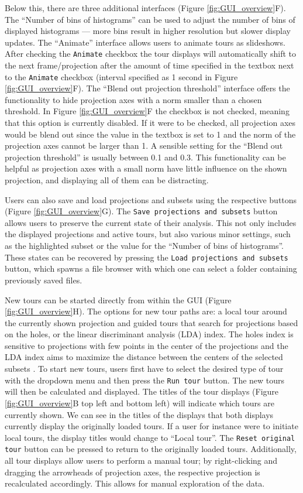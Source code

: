 \documentclass[article]{ajs}
\begin{document}
Below this, there are three additional interfaces (Figure \ref{fig:GUI_overview}F). The ``Number of bins of histograms'' can be used to adjust the number of bins of displayed histograms — more bins result in higher resolution but slower display updates. The ``Animate'' interface allows users to animate tours as slideshows. After checking the \texttt{Animate} checkbox the tour displays will automatically shift to the next frame/projection after the amount of time specified in the textbox next to the \texttt{Animate} checkbox (interval specified as 1 second in Figure \ref{fig:GUI_overview}F). The ``Blend out projection threshold'' interface offers the functionality to hide projection axes with a norm smaller than a chosen threshold. In Figure \ref{fig:GUI_overview}F the checkbox is not checked, meaning that this option is currently disabled. If it were to be checked, all projection axes would be blend out since the value in the textbox is set to 1 and the norm of the projection axes cannot be larger than 1. A sensible setting for the ``Blend out projection threshold'' is usually between 0.1 and 0.3. This functionality can be helpful as projection axes with a small norm have little influence on the shown projection, and displaying all of them can be distracting.

Users can also save and load projections and subsets using the respective buttons (Figure \ref{fig:GUI_overview}G). The \texttt{Save projections and subsets} button allows users to preserve the current state of their analysis. This not only includes the displayed projections and active tours, but also various minor settings, such as the highlighted subset or the value for the ``Number of bins of histograms''. These states can be recovered by pressing the \texttt{Load projections and subsets} button, which spawns a file browser with which one can select a folder containing previously saved files.

New tours can be started directly from within the GUI (Figure \ref{fig:GUI_overview}H). The options for new tour paths are: a local tour around the currently shown projection and guided tours that search for projections based on the holes, or the linear discriminant analysis (LDA) index. The holes index is sensitive to projections with few points in the center of the projections and the LDA index aims to maximize the distance between the centers of the selected subsets \citep{lckl2005, ggobi}. To start new tours, users first have to select the desired type of tour with the dropdown menu and then press the \texttt{Run tour} button. The new tours will then be calculated and displayed. The titles of the tour displays (Figure \ref{fig:GUI_overview}B top left and bottom left) will indicate which tours are currently shown. We can see in the titles of the displays that both displays currently display the originally loaded tours. If a user for instance were to initiate local tours, the display titles would change to ``Local tour''. The \texttt{Reset original tour} button can be pressed to return to the originally loaded tours. Additionally, all tour displays allow users to perform a manual tour; by right-clicking and dragging the arrowheads of projection axes, the respective projection is recalculated accordingly. This allows for manual exploration of the data.
\end{document}
